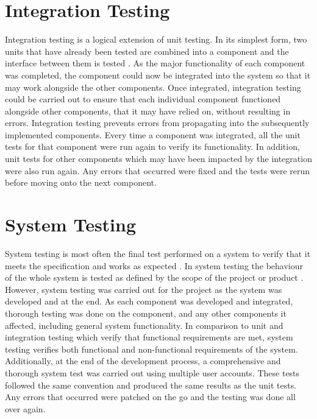 \begin{longtabu}
\caption{Unit testing}
\label{tab:unit-testing}
\end{longtabu}

\section{Integration Testing}
Integration testing is a logical extension of unit testing. In its simplest form, two units that have already been tested are combined into a component and the interface between them is tested \cite{MSDN:IntegrationTesting}. As the major functionality of each component was completed, the component could now be integrated into the system so that it may work alongside the other components. Once integrated, integration testing could be carried out to ensure that each individual component functioned alongside other components, that it may have relied on, without resulting in errors. Integration testing prevents errors from propagating into the subsequently implemented components. Every time a component was integrated, all the unit tests for that component were run again to verify its functionality. In addition, unit tests for other components which may have been impacted by the integration were also run again. Any errors that occurred were fixed and the tests were rerun before moving onto the next component.

\section{System Testing}
System testing is most often the final test performed on a system to verify that it meets the specification and works as expected \cite{ISTQB:SystemTesting}. In system testing the behaviour of the whole system is tested as defined by the scope of the project or product \cite{ISTQB:SystemTesting}. However, system testing was carried out for the project as the system was developed and at the end. As each component was developed and integrated, thorough testing was done on the component, and any other components it affected, including general system functionality. In comparison to unit and integration testing which verify that functional requirements are met, system testing verifies both functional and non-functional requirements of the system. Additionally, at the end of the development process, a comprehensive and thorough system test was carried out using multiple user accounts. These tests followed the same convention and produced the same results as the unit tests. Any errors that occurred were patched on the go and the testing was done all over again.

